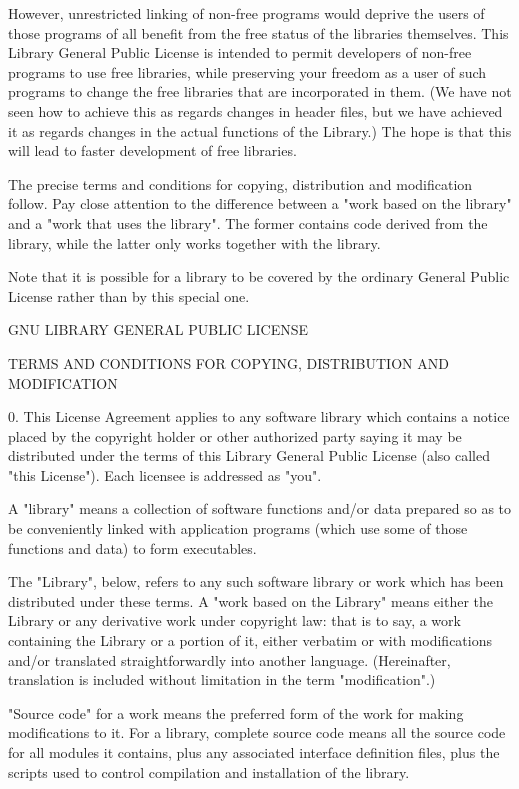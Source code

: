 \documentclass[twoside]{tceusermanual}
\begin{document}
However, unrestricted linking of non-free programs would deprive
the users of those programs of all benefit from the free status
of the libraries themselves.  This Library General Public
License is intended to permit developers of non-free programs to
use free libraries, while preserving your freedom as a user of
such programs to change the free libraries that are incorporated
in them.  (We have not seen how to achieve this as regards
changes in header files, but we have achieved it as regards
changes in the actual functions of the Library.)  The hope is
that this will lead to faster development of free libraries.

The precise terms and conditions for copying, distribution and
modification follow.  Pay close attention to the difference
between a "work based on the library" and a "work that uses the
library".  The former contains code derived from the library,
while the latter only works together with the library.

Note that it is possible for a library to be covered by the
ordinary General Public License rather than by this special one.

\begin{center}
                GNU LIBRARY GENERAL PUBLIC LICENSE

 TERMS AND CONDITIONS FOR COPYING, DISTRIBUTION AND MODIFICATION
\end{center}

0. This License Agreement applies to any software library which
contains a notice placed by the copyright holder or other
authorized party saying it may be distributed under the terms of
this Library General Public License (also called "this
License").  Each licensee is addressed as "you".

A "library" means a collection of software functions and/or data
prepared so as to be conveniently linked with application
programs (which use some of those functions and data) to form
executables.

The "Library", below, refers to any such software library or
work which has been distributed under these terms.  A "work
based on the Library" means either the Library or any derivative
work under copyright law: that is to say, a work containing the
Library or a portion of it, either verbatim or with
modifications and/or translated straightforwardly into another
language.  (Hereinafter, translation is included without
limitation in the term "modification".)

"Source code" for a work means the preferred form of the work
for making modifications to it.  For a library, complete source
code means all the source code for all modules it contains, plus
any associated interface definition files, plus the scripts used
to control compilation and installation of the library.
\end{document}
